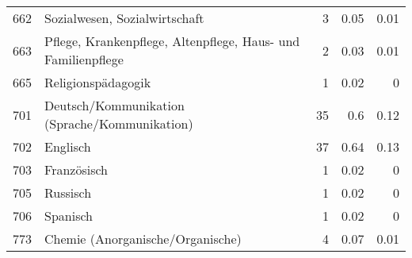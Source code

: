 \begin{longtable}{lXrrr}
        662 & \multicolumn{1}{X}{Sozialwesen, Sozialwirtschaft} & %
          \num{3} &
          \num[round-mode=places,round-precision=2]{0,05} &
          \num[round-mode=places,round-precision=2]{0,01} \\

        663 & \multicolumn{1}{X}{Pflege, Krankenpflege, Altenpflege, Haus- und Familienpflege} & %
          \num{2} &
          \num[round-mode=places,round-precision=2]{0,03} &
          \num[round-mode=places,round-precision=2]{0,01} \\

        665 & \multicolumn{1}{X}{Religionspädagogik} & %
          \num{1} &
          \num[round-mode=places,round-precision=2]{0,02} &
          \num[round-mode=places,round-precision=2]{0} \\

        701 & \multicolumn{1}{X}{Deutsch/Kommunikation (Sprache/Kommunikation)} & %
          \num{35} &
          \num[round-mode=places,round-precision=2]{0,6} &
          \num[round-mode=places,round-precision=2]{0,12} \\

        702 & \multicolumn{1}{X}{Englisch} & %
          \num{37} &
          \num[round-mode=places,round-precision=2]{0,64} &
          \num[round-mode=places,round-precision=2]{0,13} \\

        703 & \multicolumn{1}{X}{Französisch} & %
          \num{1} &
          \num[round-mode=places,round-precision=2]{0,02} &
          \num[round-mode=places,round-precision=2]{0} \\

        705 & \multicolumn{1}{X}{Russisch} & %
          \num{1} &
          \num[round-mode=places,round-precision=2]{0,02} &
          \num[round-mode=places,round-precision=2]{0} \\

        706 & \multicolumn{1}{X}{Spanisch} & %
          \num{1} &
          \num[round-mode=places,round-precision=2]{0,02} &
          \num[round-mode=places,round-precision=2]{0} \\

        773 & \multicolumn{1}{X}{Chemie (Anorganische/Organische)} & %
          \num{4} &
          \num[round-mode=places,round-precision=2]{0,07} &
          \num[round-mode=places,round-precision=2]{0,01} \\


\end{longtable}
